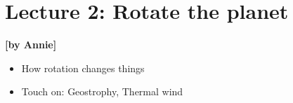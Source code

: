 
\section{Lecture 2: Rotate the planet}\label{sec:lecture2}
\begin{flushright}\textbf{[by Annie]}\end{flushright}
  
 \begin{itemize}
   \item
   How rotation changes things
   \item
   Touch on: Geostrophy, Thermal wind
   
\end{itemize}
